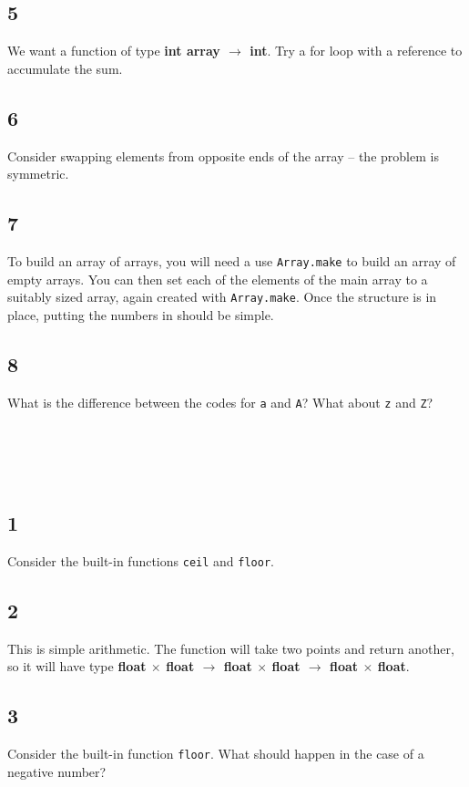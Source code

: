 \documentclass[]{book}
\newcommand\upquote[1]{\textquotesingle#1\textquotesingle}
\begin{document}
\begin{multicols*}{2}
\subsection*{5}
We want a function of type \textbf{\textsf{int array $\rightarrow$ int}}. Try a for loop with a reference to accumulate the sum.

\subsection*{6}
Consider swapping elements from opposite ends of the array -- the problem is symmetric.

\subsection*{7}
To build an array of arrays, you will need a use \texttt{Array.make} to build an array of empty arrays. You can then set each of the elements of the main array to a suitably sized array, again created with \texttt{Array.make}. Once the structure is in place, putting the numbers in should be simple.

\subsection*{8}
What is the difference between the codes for \texttt{\upquote{a}} and \texttt{\upquote{A}}? What about \texttt{\upquote{z}} and \texttt{\upquote{Z}}?

\section*{\\ }
\subsection*{1}
Consider the built-in functions \texttt{ceil} and \texttt{floor}. 

\subsection*{2}
This is simple arithmetic. The function will take two points and return another, so it will have type \textbf{\textsf{float $\times$ float $\rightarrow$ float $\times$ float $\rightarrow$ float $\times$ float}}.

\subsection*{3}
Consider the built-in function \texttt{floor}. What should happen in the case of a negative number?


\end{multicols*}
\end{document}
